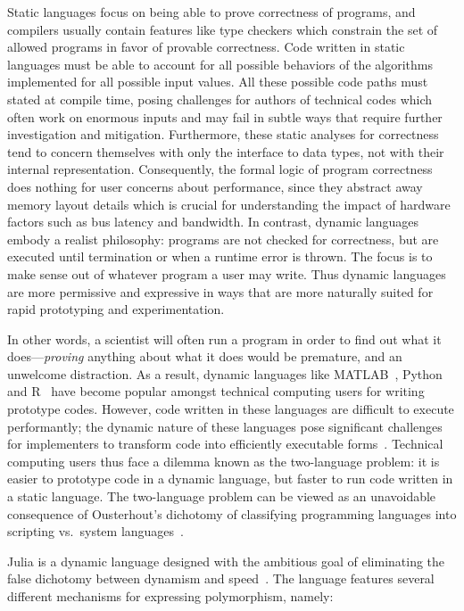 \documentclass[pldi]{sigplanconf-pldi15}
\begin{document}
Static languages focus on being able to prove correctness of programs, and
compilers usually contain features like type checkers which constrain the set
of allowed programs in favor of provable correctness. Code written in static
languages must be able to account for all possible behaviors of the algorithms
implemented for all possible input values. All these possible code paths must
stated at compile time, posing challenges for authors of technical codes which
often work on enormous inputs and may fail in subtle ways that require further
investigation and mitigation. Furthermore, these static analyses for
correctness tend to concern themselves with only the interface to data types,
not with their internal representation. Consequently, the formal logic of
program correctness does nothing for user concerns about performance, since
they abstract away memory layout details which is crucial for understanding the
impact of hardware factors such as bus latency and bandwidth. In contrast,
dynamic languages embody a realist philosophy: programs are not checked for
correctness, but are executed until termination or when a runtime error is
thrown. The focus is to make sense out of whatever program a user may write.
Thus dynamic languages are more permissive and expressive in ways that are more
naturally suited for rapid prototyping and experimentation.

In other words, a scientist will often run a program in order to find out what
it does---\emph{proving} anything about what it does would be premature, and an
unwelcome distraction. As a result, dynamic languages like
MATLAB~\cite{matlab}, Python~\cite{pythonlib,pythonref} and R~\cite{rlang} have
become popular amongst technical computing users for writing prototype codes.
However, code written in these languages are difficult to execute performantly;
the dynamic nature of these languages pose significant challenges for
implementers to transform code into efficiently executable
forms~\cite{Joisha2001,Joisha2006,Seljebotn2009}. Technical computing users
thus face a dilemma known as the two-language problem: it is easier to
prototype code in a dynamic language, but faster to run code written in a
static language. The two-language problem can be viewed as an unavoidable
consequence of Ousterhout's dichotomy of classifying programming languages into
scripting vs.\ system languages~\cite{Ousterhout1998,Hoare2014}. 

Julia is a dynamic language designed with the ambitious goal of eliminating the
false dichotomy between dynamism and speed~\cite{Bezanson2012,Bezanson2014b}.
The language features several different mechanisms for expressing polymorphism,
namely:
\end{document}
